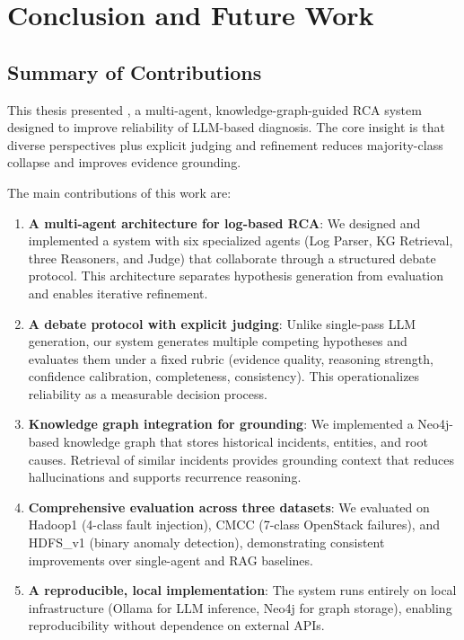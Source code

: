 
\chapter{Conclusion and Future Work}

\section{Summary of Contributions}
This thesis presented \systemname{}, a multi-agent, knowledge-graph-guided RCA system designed to
improve reliability of LLM-based diagnosis. The core insight is that diverse perspectives plus
explicit judging and refinement reduces majority-class collapse and improves evidence grounding.

The main contributions of this work are:
\begin{enumerate}
  \item \textbf{A multi-agent architecture for log-based RCA}: We designed and implemented a
        system with six specialized agents (Log Parser, KG Retrieval, three Reasoners, and Judge)
        that collaborate through a structured debate protocol. This architecture separates
        hypothesis generation from evaluation and enables iterative refinement.

  \item \textbf{A debate protocol with explicit judging}: Unlike single-pass LLM generation, our
        system generates multiple competing hypotheses and evaluates them under a fixed rubric
        (evidence quality, reasoning strength, confidence calibration, completeness, consistency).
        This operationalizes reliability as a measurable decision process.

  \item \textbf{Knowledge graph integration for grounding}: We implemented a Neo4j-based
        knowledge graph that stores historical incidents, entities, and root causes. Retrieval of
        similar incidents provides grounding context that reduces hallucinations and supports
        recurrence reasoning.

  \item \textbf{Comprehensive evaluation across three datasets}: We evaluated on Hadoop1
        (4-class fault injection), CMCC (7-class OpenStack failures), and HDFS\_v1 (binary
        anomaly detection), demonstrating consistent improvements over single-agent and RAG
        baselines.

  \item \textbf{A reproducible, local implementation}: The system runs entirely on local
        infrastructure (Ollama for LLM inference, Neo4j for graph storage), enabling
        reproducibility without dependence on external APIs.
\end{enumerate}

